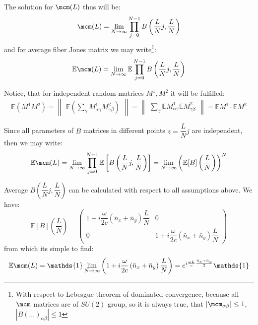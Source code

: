 \documentclass[12pt, notitlepage]{report}
\begin{document}
The solution for $\mcm(L)$ thus will be:
\begin{equation}
	\label{M}
	\mcm(L) = \lim\limits_{N\rightarrow\infty}\prod\limits_{j=0}^{N-1} B\left(\dfrac{L}{N}j, \dfrac{L}{N}\right)
\end{equation}
and for average fiber Jones matrix we may write\footnote{With respect to Lebesgue theorem of dominated convergence, because all $\mcm$ matrices are of $SU(2)$ group, so it is always true, that $|\mcm_{\alpha\beta}| \leq 1$, $|B(\dots)_{\alpha\beta}| \leq 1$}:
\begin{equation*}
	\mathbb{E}\mcm(L) = \lim\limits_{N\rightarrow\infty}\mathbb{E}\prod\limits_{j=0}^{N-1} B\left(\dfrac{L}{N}j, \dfrac{L}{N}\right)
\end{equation*}

Notice, that for independent random matrices $M^1, M^2$ it will be fulfilled:
\begin{equation*}
	\mathbb{E}\left(M^1 M^2\right) = \begin{Vmatrix}
		\mathbb{E}\left(\sum_\gamma M^1_{\alpha\gamma}M^2_{\gamma\beta}\right) 
	\end{Vmatrix} = \begin{Vmatrix}
	\sum_\gamma \mathbb{E}M^1_{\alpha\gamma} \mathbb{E}M^2_{\gamma\beta}
\end{Vmatrix} = \mathbb{E}M^1\cdot \mathbb{E}M^2
\end{equation*}


Since all parameters of $B$ matrices in different points $z = \dfrac{L}{N}j$ are independent, then we may write:
\begin{equation*}
	\mathbb{E}\mcm(L) = \lim\limits_{N\rightarrow\infty}\prod\limits_{j=0}^{N-1} \mathbb{E}\left[B\left(\dfrac{L}{N}j, \dfrac{L}{N}\right)\right] = \lim\limits_{N\rightarrow\infty} \left(\mathbb{E}[B]\left(\dfrac{L}{N}\right)\right)^N
\end{equation*}

Average $B\left(\dfrac{L}{N}j, \dfrac{L}{N}\right)$ can be calculated with respect to all assumptions above. We have:
\begin{equation*}
	\mathbb{E}[B]\left(\dfrac{L}{N}\right) = \begin{pmatrix}
		1 + i\dfrac{\omega}{2c}\left(\bar{n}_x + \bar{n}_y\right)\dfrac{L}{N} & 0 \\
		0 & 1 + i\dfrac{\omega}{2c}\left(\bar{n}_x + \bar{n}_y\right)\dfrac{L}{N}
	\end{pmatrix}
\end{equation*}
from which its simple to find:
\begin{equation}
	\mathbb{E}\mcm(L) = \mathds{1}\lim\limits_{N\rightarrow\infty}\left(1 + i\dfrac{\omega}{2c}\left(\bar{n}_x + \bar{n}_y\right)\dfrac{L}{N} \right) =  e^{i\frac{\omega L}{c}\frac{\bar{n}_x + \bar{n}_y}{2}}\mathds{1}
\end{equation}
\end{document}
